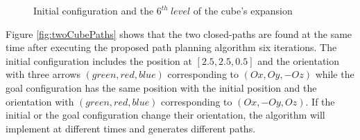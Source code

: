 \begin{center}
\begin{figure}[H]
\hfill
\caption{Initial configuration and the $6^{th}\ level$ of the cube's expansion} 
\end{figure}
\end{center}

\noindent Figure \ref{fig:twoCubePaths} shows that the two closed-paths are found at the same time after executing the proposed path planning algorithm six iterations. The initial configuration includes the position at $[2.5,2.5,0.5]$ and the orientation with three arrows $(green,red,blue)$ corresponding to $(Ox,Oy,-Oz)$ while the goal configuration has the same position with the initial position and the orientation with $(green,red,blue)$ corresponding to $(Ox,-Oy,Oz)$. If the initial or the goal configuration change their orientation, the algorithm will implement at different times and generates different paths.

